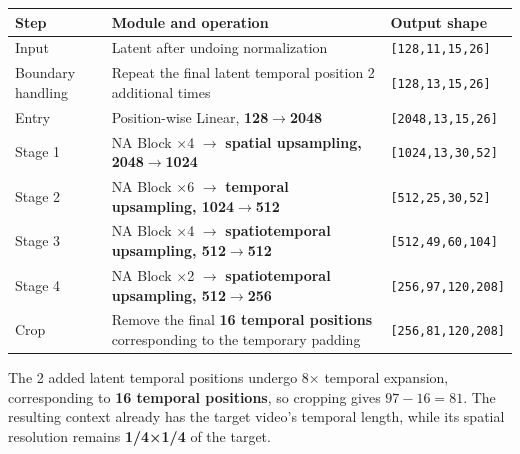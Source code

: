 \documentclass[
  11pt,
  a4paper,
]{article}
\newcounter{none} %
\begin{document}
{\def\LTcaptype{none} %
\begin{longtable}[]{@{}
  >{\raggedright\arraybackslash}p{}
  >{\raggedright\arraybackslash}p{}
  >{\raggedright\arraybackslash}p{}@{}}
\toprule\noalign{}
\begin{minipage}[b]{\linewidth}\raggedright
Step
\end{minipage} & \begin{minipage}[b]{\linewidth}\raggedright
Module and operation
\end{minipage} & \begin{minipage}[b]{\linewidth}\raggedright
Output shape
\end{minipage} \\
\midrule\noalign{}
\endhead
\bottomrule\noalign{}
\endlastfoot
Input & Latent after undoing normalization &
\texttt{{[}128,11,15,26{]}} \\
Boundary handling & Repeat the final latent temporal position 2
additional times & \texttt{{[}128,13,15,26{]}} \\
Entry & Position-wise Linear, \textbf{128\(\rightarrow\)2048} &
\texttt{{[}2048,13,15,26{]}} \\
Stage 1 & NA Block ×4 \(\rightarrow\) \textbf{spatial upsampling,
2048\(\rightarrow\)1024} & \texttt{{[}1024,13,30,52{]}} \\
Stage 2 & NA Block ×6 \(\rightarrow\) \textbf{temporal upsampling,
1024\(\rightarrow\)512} & \texttt{{[}512,25,30,52{]}} \\
Stage 3 & NA Block ×4 \(\rightarrow\) \textbf{spatiotemporal upsampling,
512\(\rightarrow\)512} & \texttt{{[}512,49,60,104{]}} \\
Stage 4 & NA Block ×2 \(\rightarrow\) \textbf{spatiotemporal upsampling,
512\(\rightarrow\)256} & \texttt{{[}256,97,120,208{]}} \\
Crop & Remove the final \textbf{16 temporal positions} corresponding to
the temporary padding & \texttt{{[}256,81,120,208{]}} \\
\end{longtable}
}

\endgroup

The 2 added latent temporal positions undergo 8× temporal expansion,
corresponding to \textbf{16 temporal positions}, so cropping gives
\textbf{\(97-16=81\)}. The resulting context already has the target
video's temporal length, while its spatial resolution remains
\textbf{1/4×1/4} of the target.
\end{document}

